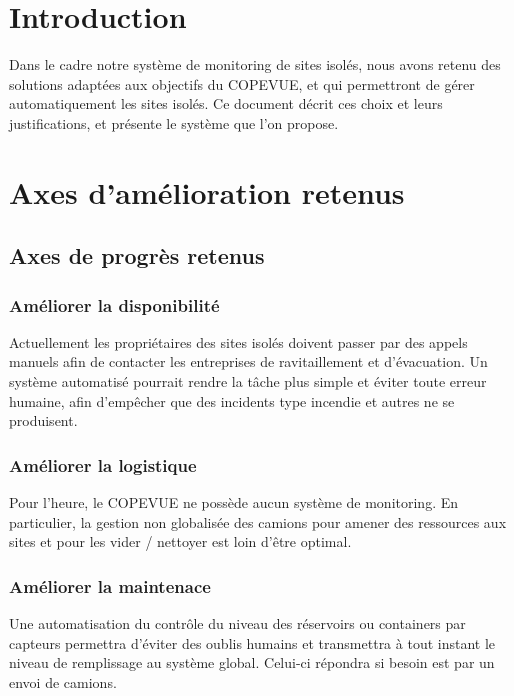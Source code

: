 \section{Introduction}

Dans le cadre notre système de monitoring de sites isolés, nous avons retenu des solutions adaptées aux objectifs du COPEVUE, et qui permettront de gérer automatiquement les sites isolés. Ce document décrit ces choix et leurs justifications, et présente le système que l’on propose.

\section{Axes d’amélioration retenus}

\subsection{Axes de progrès retenus}

\subsubsection{Améliorer la disponibilité}

Actuellement les propriétaires des sites isolés doivent passer par des appels manuels afin de contacter les entreprises de ravitaillement et d’évacuation. Un système automatisé pourrait rendre la tâche plus simple et éviter toute erreur humaine, afin d'empêcher que des incidents type incendie et autres ne se produisent.

\subsubsection{Améliorer la logistique}

Pour l’heure, le COPEVUE ne possède aucun système de monitoring. En particulier, la gestion non globalisée des camions pour amener des ressources aux sites et pour les vider / nettoyer est loin d'être optimal.

\subsubsection{Améliorer la maintenace}

Une automatisation du contrôle du niveau des réservoirs ou containers par capteurs permettra d’éviter des oublis humains et transmettra à tout instant le niveau de remplissage au système global. Celui-ci répondra si besoin est par un envoi de camions.

